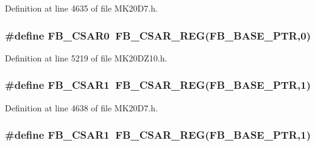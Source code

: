 Definition at line 4635 of file M\+K20\+D7.\+h.

\subsubsection[{\texorpdfstring{F\+B\+\_\+\+C\+S\+A\+R0}{FB_CSAR0}}]{\setlength{\rightskip}{0pt plus 5cm}\#define F\+B\+\_\+\+C\+S\+A\+R0~{\bf F\+B\+\_\+\+C\+S\+A\+R\+\_\+\+R\+EG}({\bf F\+B\+\_\+\+B\+A\+S\+E\+\_\+\+P\+TR},0)}\hypertarget{group___f_b___register___accessor___macros_ga444494eb7e637dcea435c4dc66ed7cd4}{}\label{group___f_b___register___accessor___macros_ga444494eb7e637dcea435c4dc66ed7cd4}


Definition at line 5219 of file M\+K20\+D\+Z10.\+h.

\subsubsection[{\texorpdfstring{F\+B\+\_\+\+C\+S\+A\+R1}{FB_CSAR1}}]{\setlength{\rightskip}{0pt plus 5cm}\#define F\+B\+\_\+\+C\+S\+A\+R1~{\bf F\+B\+\_\+\+C\+S\+A\+R\+\_\+\+R\+EG}({\bf F\+B\+\_\+\+B\+A\+S\+E\+\_\+\+P\+TR},1)}\hypertarget{group___f_b___register___accessor___macros_gaebd16f39ec44a2a444f72aa80567d84c}{}\label{group___f_b___register___accessor___macros_gaebd16f39ec44a2a444f72aa80567d84c}


Definition at line 4638 of file M\+K20\+D7.\+h.

\subsubsection[{\texorpdfstring{F\+B\+\_\+\+C\+S\+A\+R1}{FB_CSAR1}}]{\setlength{\rightskip}{0pt plus 5cm}\#define F\+B\+\_\+\+C\+S\+A\+R1~{\bf F\+B\+\_\+\+C\+S\+A\+R\+\_\+\+R\+EG}({\bf F\+B\+\_\+\+B\+A\+S\+E\+\_\+\+P\+TR},1)}\hypertarget{group___f_b___register___accessor___macros_gaebd16f39ec44a2a444f72aa80567d84c}{}\label{group___f_b___register___accessor___macros_gaebd16f39ec44a2a444f72aa80567d84c}


